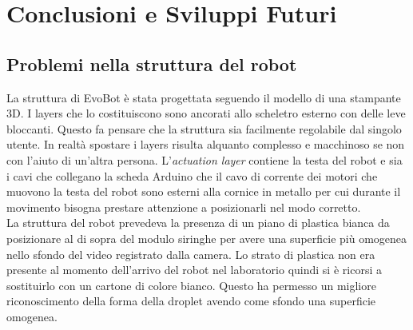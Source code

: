 \chapter{Conclusioni e Sviluppi Futuri}
\vspace{0.5cm}
\label{cha:789}
\section{Problemi nella struttura del robot}
\label{sec:456}
La struttura di EvoBot è stata progettata seguendo il modello di una stampante 3D. I layers che lo costituiscono sono ancorati allo scheletro esterno con delle leve bloccanti. Questo fa pensare che la struttura sia facilmente regolabile dal singolo utente. In realtà spostare i layers risulta alquanto complesso e macchinoso se non con l'aiuto di un'altra persona. L'\emph{actuation layer} contiene la testa del robot e sia i cavi che collegano la scheda Arduino che il cavo di corrente dei motori che muovono la testa del robot sono esterni alla cornice in metallo per cui durante il movimento bisogna prestare attenzione a posizionarli nel modo corretto.
\\La struttura del robot prevedeva la presenza di un piano di plastica bianca da posizionare al di sopra del modulo siringhe per avere una superficie più omogenea nello sfondo del video registrato dalla camera. Lo strato di plastica non era presente al momento dell'arrivo del robot nel laboratorio quindi si è ricorsi a sostituirlo con un cartone di colore bianco. Questo ha permesso un migliore riconoscimento della forma della droplet avendo come sfondo una superficie omogenea. 

